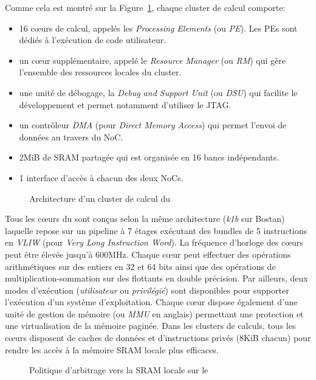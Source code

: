 \documentclass[main.tex]{subfiles}
\begin{document}
Comme cela est montré sur la Figure~\ref{fig_resumeFr_MPPAComputeCluster}, chaque cluster de calcul comporte:
\begin{itemize}
    \item 16 c\oe{}urs de calcul, appelés les \emph{Processing Elements} (ou \emph{PE}). Les PEs sont dédiés à l'exécution de code utilisateur.
    \item un c\oe{}ur supplémentaire, appelé le \emph{Resource Manager} (ou \emph{RM}) qui gère l'ensemble des ressources locales du cluster.
    \item une unité de débogage, la \emph{Debug and Support Unit} (ou \emph{DSU}) qui facilite le développement et permet notamment d'utiliser le JTAG.
    \item un contrôleur \emph{DMA} (pour \emph{Direct Memory Access}) qui permet l'envoi de données au travers du NoC.
    \item 2MiB de SRAM partagée qui est organisée en 16 bancs indépendants.
    \item 1 interface d'accès à chacun des deux NoCs.
\end{itemize}
\begin{figure}
    \centering
    \scalebox{0.8}{}
    \caption{Architecture d'un cluster de calcul du \mppalong}
    \label{fig_resumeFr_MPPAComputeCluster}
\end{figure}

Tous les c\oe{}urs du \mppalong sont conçus selon la même architecture (\emph{k1b} sur Bostan) laquelle repose sur un pipeline à 7 étages exécutant des bundles de 5 instructions en \emph{VLIW} (pour \emph{Very Long Instruction Word}). La fréquence d'horloge des c\oe{}urs peut être élevée jusqu'à 600MHz. Chaque c\oe{}ur peut effectuer des opérations arithmétiques sur des entiers en 32 et 64 bits ainsi que des opérations de multiplication-sommation sur des flottants en double précision. Par ailleurs, deux modes d'exécution (\emph{utilisateur} ou \emph{privilégié}) sont disponibles pour supporter l'exécution d'un système d'exploitation. Chaque c\oe{}ur dispose également d'une unité de gestion de mémoire (ou \emph{MMU} en anglais) permettant une protection et une virtualisation de la mémoire paginée. Dans les clusters de calculs, tous les c\oe{}urs disposent de caches de données et d'instructions privés (8KiB chacun) pour rendre les accès à la mémoire SRAM locale plus efficaces.

\begin{figure}
    \centering
    \scalebox{0.8}{}
    \caption{Politique d'arbitrage vers la SRAM locale sur le \mppalong}
    \label{fig_resumeFr_MPPASMEMarbiter}
\end{figure}
\end{document}
